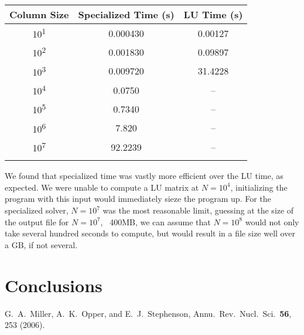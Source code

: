 \documentclass[10pt,showpacs,preprintnumbers,footinbib,amsmath,amssymb,aps,prl,twocolumn,groupedaddress,superscriptaddress,showkeys]{revtex4-1}
\begin{document}
	\begin{center}
		\begin{tabular}{ccc}
			\hline \hline
			Column Size & Specialized Time (s) & LU Time (s)\\
			\hline
			10\textsuperscript{1} & 0.000430 & 0.00127\\
			10\textsuperscript{2} & 0.001830 &  0.09897\\
			10\textsuperscript{3} & 0.009720 & 31.4228\\
			10\textsuperscript{4} & 0.0750       &  --\\
			10\textsuperscript{5} & 0.7340  & --\\
			10\textsuperscript{6} & 7.820  & --\\
			10\textsuperscript{7} & 92.2239  & --\\
			\hline
			\label{timingtable}
		\end{tabular}
	\end{center}
	We found that specialized time was vastly more efficient over the LU time, as expected. We were unable to compute a LU matrix at $N=10^{4}$, initializing the program with this input would immediately sieze the program up. For the specialized solver, $N=10^{7}$ was the most reasonable limit, guessing at the size of the output file for $N=10^{7}$, ~400MB, we can assume that $N=10^{8}$ would not only take several hundred seconds to compute, but would result in a file size well over a GB, if not several. 	

\section{Conclusions}

\begin{thebibliography}{99}
 G.~A.~Miller, A.~K.~Opper, and E.~J.~Stephenson, Annu.~Rev.~Nucl.~Sci.~{\bf 56}, 253 (2006).
\end{thebibliography}
\end{document}
